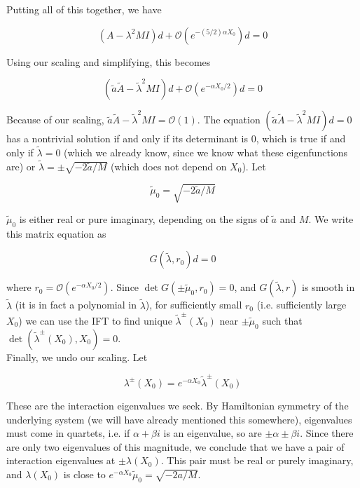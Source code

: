 \documentclass[12pt]{article}
\begin{document}
\begin{enumerate}
Putting all of this together, we have 

\[
(A - \lambda^2 MI )d + \mathcal{O}\left( e^{-(5/2) \alpha X_0} \right) d = 0
\]

Using our scaling and simplifying, this becomes

\[
(\tilde{a}\tilde{A} - \tilde{\lambda}^2 MI )d + \mathcal{O}\left( e^{-\alpha X_0/2} \right) d = 0
\]

Because of our scaling, $\tilde{a} \tilde{A} - \tilde{\lambda}^2 M I  = \mathcal{O}(1)$. The equation $(\tilde{a} \tilde{A} - \tilde{\lambda}^2 M I )d = 0$ has a nontrivial solution if and only if its determinant is 0, which is true if and only if $\tilde{\lambda} = 0$ (which we already know, since we know what these eigenfunctions are) or $\tilde{\lambda} = \pm \sqrt{-2 \tilde{a}/M}$ (which does not depend on $X_0$). Let

\[
\tilde{\mu}_0 = \sqrt{-2 \tilde{a}/M}
\]

$\tilde{\mu}_0$ is either real or pure imaginary, depending on the signs of $\tilde{a}$ and $M$. We write this matrix equation as

\[
G(\tilde{\lambda}, r_0)d = 0
\]

where $r_0 = \mathcal{O}(e^{-\alpha X_0/2})$. Since $\det G(\pm \tilde{\mu}_0, r_0) = 0$, and $G(\tilde{\lambda}, r)$ is smooth in $\tilde{\lambda}$ (it is in fact a polynomial in $\tilde{\lambda}$), for sufficiently small $r_0$ (i.e. sufficiently large $X_0$) we can use the IFT to find unique $\tilde{\lambda}^\pm(X_0)$ near $\pm \tilde{\mu}_0$ such that $\det( \tilde{\lambda}^\pm(X_0), X_0) = 0$. \\

Finally, we undo our scaling. Let

\[
\lambda^\pm(X_0) = e^{-\alpha X_0} \tilde{\lambda}^\pm(X_0)
\]

These are the interaction eigenvalues we seek. By Hamiltonian symmetry of the underlying system (we will have already mentioned this somewhere), eigenvalues must come in quartets, i.e. if $\alpha + \beta i$ is an eigenvalue, so are $\pm \alpha \pm \beta i$. Since there are only two eigenvalues of this magnitude, we conclude that we have a pair of interaction eigenvalues at $\pm \lambda(X_0)$. This pair must be real or purely imaginary, and $\lambda(X_0)$ is close to $e^{-\alpha X_0} \tilde{\mu}_0 = \sqrt{-2a/M}$.





\end{enumerate}
\end{document}
